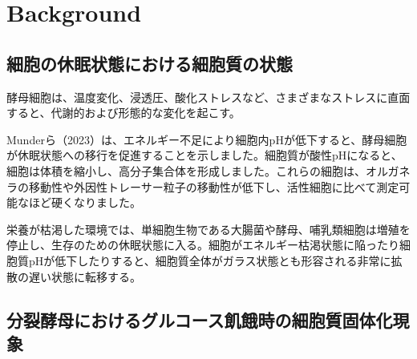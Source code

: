\chapter{Background}

\section{細胞の休眠状態における細胞質の状態}

酵母細胞は、温度変化、浸透圧、酸化ストレスなど、さまざまなストレスに直面すると、代謝的および形態的な変化を起こす。

Munderら（2023）は、エネルギー不足により細胞内pHが低下すると、酵母細胞が休眠状態への移行を促進することを示しました。細胞質が酸性pHになると、細胞は体積を縮小し、高分子集合体を形成しました。これらの細胞は、オルガネラの移動性や外因性トレーサー粒子の移動性が低下し、活性細胞に比べて測定可能なほど硬くなりました。

栄養が枯渇した環境では、単細胞生物である大腸菌や酵母、哺乳類細胞は増殖を停止し、生存のための休眠状態に入る。細胞がエネルギー枯渇状態に陥ったり細胞質pHが低下したりすると、細胞質全体がガラス状態とも形容される非常に拡散の遅い状態に転移する。


\section{分裂酵母におけるグルコース飢餓時の細胞質固体化現象}

